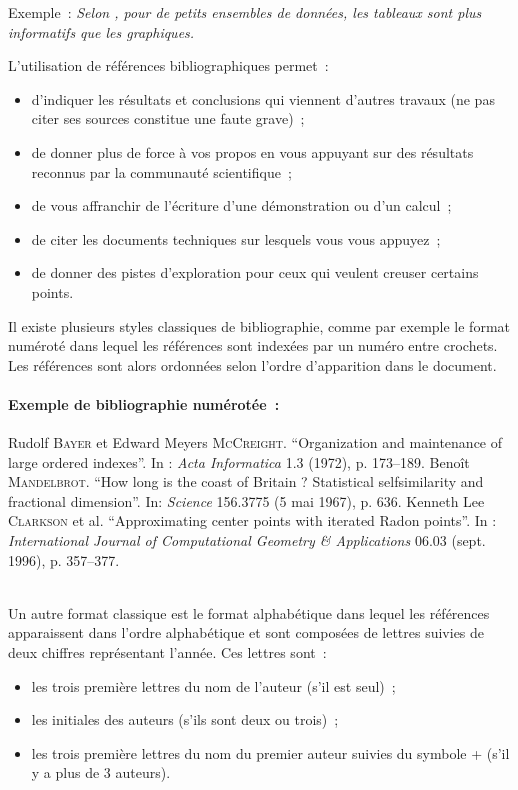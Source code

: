 Exemple~: \emph{Selon \cite{tufte}, pour de petits ensembles de
  données, les tableaux sont plus informatifs que les graphiques.}

L'utilisation de références bibliographiques permet~:
\begin{itemize}
\item d'indiquer les résultats et conclusions qui viennent d'autres
  travaux (ne pas citer ses sources constitue une faute grave)~;
\item de donner plus de force à vos propos en vous appuyant sur des résultats
  reconnus par la communauté scientifique~;
\item de vous affranchir de l'écriture d'une démonstration ou d'un calcul~;
\item de citer les documents techniques sur lesquels vous vous appuyez~;
\item de donner des pistes d'exploration pour ceux qui veulent creuser
  certains points.
\end{itemize}

Il existe plusieurs styles classiques de bibliographie, comme par exemple le
format numéroté dans lequel les références sont indexées par un numéro entre
crochets. Les références sont alors ordonnées selon l'ordre d'apparition dans
le document.

\paragraph{Exemple de bibliographie numérotée~:}
\begingroup
\renewcommand{\section}[2]{}%
\begin{thebibliography}{1}
 Rudolf \textsc{Bayer} et Edward Meyers \textsc{McCreight}. ``Organization and
  maintenance of large ordered indexes''. In : \emph{Acta Informatica} 1.3
  (1972), p. 173--189.
 Benoît \textsc{Mandelbrot}. ``How long is the coast of Britain ?
  Statistical selfsimilarity and fractional dimension''. In: \emph{Science}
  156.3775 (5 mai 1967), p. 636.
 Kenneth Lee \textsc{Clarkson} et al. ``Approximating center points with
  iterated Radon points''. In : \emph{International Journal of
    Computational Geometry \& Applications} 06.03 (sept. 1996), p. 357--377.
\end{thebibliography}
\endgroup

~\\
Un autre format classique est le format alphabétique dans lequel les
références apparaissent dans l'ordre alphabétique et sont composées de lettres
suivies de deux chiffres représentant l'année. Ces lettres sont~:
\begin{itemize}
\item les trois première lettres du nom de l'auteur (s'il est seul)~;
\item les initiales des auteurs (s'ils sont deux ou trois)~;
\item les trois première lettres du nom du premier auteur suivies du symbole
  \og{}+\fg{} (s'il y a plus de 3 auteurs).
\end{itemize}

